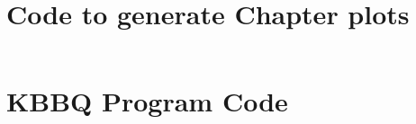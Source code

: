 
\chapter{Code to generate Chapter \protect\kbbqref{} plots}
\label{ch:kbbq_plot_code}
\inputminted{r}{ch4/scripts/plot_benchmarks.R}

\chapter{KBBQ Program Code}
\label{ch:kbbq_code}
\inputminted[breaklines]{cpp}{ch4/scripts/kbbq_include.hh}
\inputminted[breaklines]{cpp}{ch4/scripts/kbbq_src.cc}
